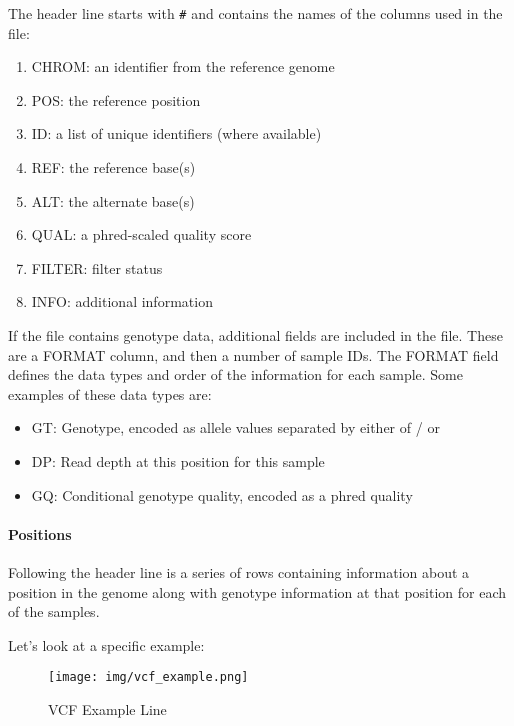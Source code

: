 \documentclass[11pt]{article}
\providecommand{\tightlist}{%
      \setlength{\itemsep}{0pt}\setlength{\parskip}{0pt}}
\begin{document}
The header line starts with \texttt{\#} and contains the names of the
columns used in the file:

\begin{enumerate}
\def\labelenumi{\arabic{enumi}.}
\tightlist
\item
  CHROM: an identifier from the reference genome
\item
  POS: the reference position
\item
  ID: a list of unique identifiers (where available)
\item
  REF: the reference base(s)
\item
  ALT: the alternate base(s)
\item
  QUAL: a phred-scaled quality score
\item
  FILTER: filter status
\item
  INFO: additional information
\end{enumerate}

If the file contains genotype data, additional fields are included in
the file. These are a FORMAT column, and then a number of sample IDs.
The FORMAT field defines the data types and order of the information for
each sample. Some examples of these data types are:

\begin{itemize}
\tightlist
\item
  GT: Genotype, encoded as allele values separated by either of / or
  \textbar{}
\item
  DP: Read depth at this position for this sample
\item
  GQ: Conditional genotype quality, encoded as a phred quality
\end{itemize}

\hypertarget{positions}{%
\paragraph{Positions}\label{positions}}

Following the header line is a series of rows containing information
about a position in the genome along with genotype information at that
position for each of the samples.

Let's look at a specific example:

    \begin{figure}
\centering
\texttt{[image: img/vcf\_example.png]}
\caption{VCF Example Line}
\end{figure}
\end{document}
